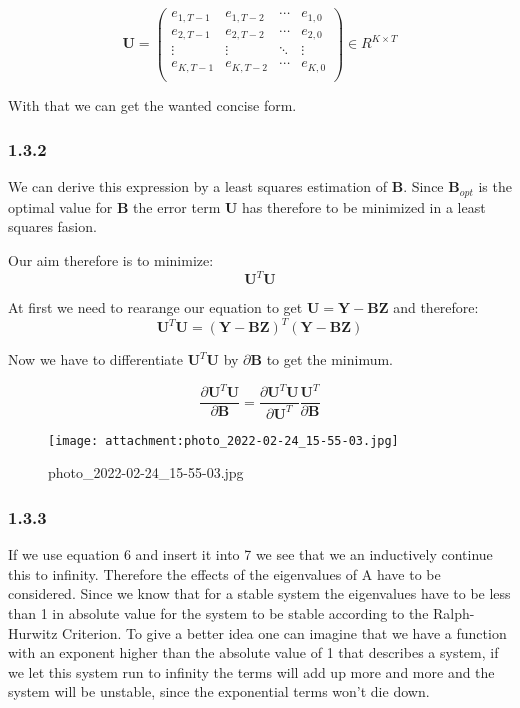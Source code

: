 \documentclass[11pt]{article}
\begin{document}
\begin{equation}
    \textbf{U} = 
    \begin{pmatrix}
        e_{1,T-1} & e_{1,T-2} & \cdots & e_{1,0} \\
        e_{2,T-1} & e_{2,T-2} & \cdots & e_{2,0} \\
        \vdots    &   \vdots  & \ddots &   \vdots \\
        e_{K,T-1} & e_{K,T-2} & \cdots & e_{K,0} \\ 
    \end{pmatrix} \in R^{K \times T}
\end{equation}

With that we can get the wanted concise form.

    \hypertarget{section}{%
\subsubsection{1.3.2}\label{section}}

    We can derive this expression by a least squares estimation of
\(\mathbf{B}\). Since \(\mathbf{B}_{opt}\) is the optimal value for
\(\mathbf{B}\) the error term \(\mathbf{U}\) has therefore to be
minimized in a least squares fasion.

Our aim therefore is to minimize: \[\mathbf{U}^{T}\mathbf{U}\]

At first we need to rearange our equation to get
\(\mathbf{U} = \mathbf{Y} - \mathbf{B}\mathbf{Z}\) and therefore:
\[\mathbf{U}^{T}\mathbf{U} = (\mathbf{Y} - \mathbf{B}\mathbf{Z})^{T}(\mathbf{Y}- \mathbf{B}\mathbf{Z})\]

    Now we have to differentiate \(\mathbf{U}^{T}\mathbf{U}\) by
\(\partial\mathbf{B}\) to get the minimum.

\[\frac{\partial \mathbf{U}^{T} \mathbf{U}}{\partial \mathbf{B}} =  \frac{\partial \mathbf{U}^{T}\mathbf{U}}{\partial \mathbf{U}^{T}} \frac{\mathbf{U}^{T}}{\partial \mathbf{B}}\]

    \begin{figure}
\centering
\texttt{[image: attachment:photo\_2022-02-24\_15-55-03.jpg]}
\caption{photo\_2022-02-24\_15-55-03.jpg}
\end{figure}

    \hypertarget{section}{%
\subsubsection{1.3.3}\label{section}}

    If we use equation 6 and insert it into 7 we see that we an inductively
continue this to infinity. Therefore the effects of the eigenvalues of A
have to be considered. Since we know that for a stable system the
eigenvalues have to be less than 1 in absolute value for the system to
be stable according to the Ralph-Hurwitz Criterion. To give a better
idea one can imagine that we have a function with an exponent higher
than the absolute value of 1 that describes a system, if we let this
system run to infinity the terms will add up more and more and the
system will be unstable, since the exponential terms won't die down.
\end{document}
